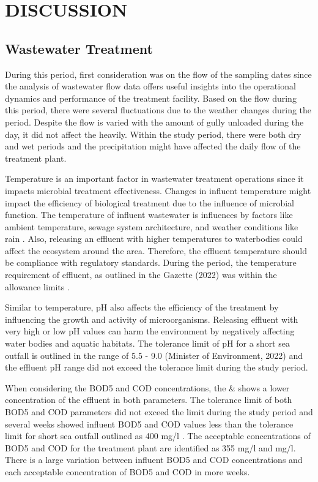 \newpage
\section{DISCUSSION}

\subsection{Wastewater Treatment}
During this period, first consideration was on the flow of the sampling dates since the analysis of wastewater flow data offers useful insights into the operational dynamics and performance of the treatment facility. Based on the flow during this period, there were several fluctuations due to the weather changes during the period. Despite the flow is varied with the amount of gully unloaded during the day, it did not affect the heavily. Within the study period, there were both dry and wet periods and the precipitation might have affected the daily flow of the treatment plant.

Temperature is an important factor in wastewater treatment operations since it impacts microbial treatment effectiveness. Changes in influent temperature might impact the efficiency of biological treatment due to the influence of microbial function. The temperature of influent wastewater is influences by factors like ambient temperature, sewage system architecture, and weather conditions like rain \cite{Brehar2019}. Also, releasing an effluent with higher temperatures to waterbodies could affect the ecosystem around the area. Therefore, the effluent temperature should be compliance with regulatory standards. During the period, the temperature requirement of effluent, as outlined in the Gazette (2022) was within the allowance limits \cite{CEA2022}.

Similar to temperature, pH also affects the efficiency of the treatment by influencing the growth and activity of microorganisms. Releasing effluent with very high or low pH values can harm the environment by negatively affecting water bodies and aquatic habitats. The tolerance limit of pH for a short sea outfall is outlined in the range of 5.5 - 9.0 (Minister of Environment, 2022) and the effluent pH range did not exceed the tolerance limit during the study period. 

When considering the \ac{BOD5} and \ac{COD} concentrations, the  \& shows a lower concentration of the effluent in both parameters. The tolerance limit of both \ac{BOD5} and \ac{COD} parameters did not exceed the limit during the study period and several weeks showed influent \ac{BOD5} and \ac{COD} values less than the tolerance limit for short sea outfall outlined as 400 mg/l \cite{CEA2022}. The acceptable concentrations of \ac{BOD5} and \ac{COD} for the treatment plant are identified as 355 mg/l and  mg/l. There is a large variation between influent \ac{BOD5} and \ac{COD} concentrations and each acceptable concentration of \ac{BOD5} and \ac{COD} in more weeks. 


